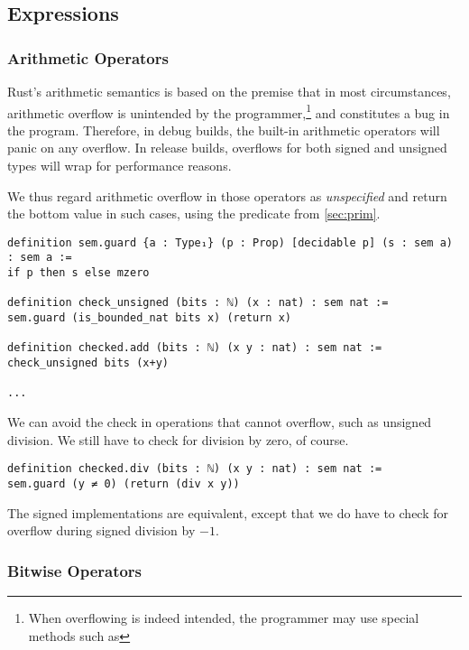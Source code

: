 \subsection{Expressions}

\subsubsection{Arithmetic Operators}
\label{sec:arith}

Rust's arithmetic semantics is based on the premise that in most circumstances,
arithmetic overflow is unintended by the programmer,\footnote{When overflowing
  is indeed intended, the programmer may use special methods such as
  } and constitutes a bug in
the program. Therefore, in debug builds, the built-in arithmetic operators will
panic on any overflow. In release builds, overflows for both signed and unsigned
types will wrap for performance reasons.

We thus regard arithmetic overflow in those operators as \emph{unspecified} and
return the bottom value in such cases, using the predicate
 from \autoref{sec:prim}.

\begin{verbatim}
definition sem.guard {a : Type₁} (p : Prop) [decidable p] (s : sem a) : sem a :=
if p then s else mzero

definition check_unsigned (bits : ℕ) (x : nat) : sem nat :=
sem.guard (is_bounded_nat bits x) (return x)

definition checked.add (bits : ℕ) (x y : nat) : sem nat :=
check_unsigned bits (x+y)

...
\end{verbatim}

We can avoid the check in operations that cannot overflow, such as unsigned
division. We still have to check for division by zero, of course.

\begin{verbatim}
definition checked.div (bits : ℕ) (x y : nat) : sem nat :=
sem.guard (y ≠ 0) (return (div x y))
\end{verbatim}

The signed implementations are equivalent, except that we do have to check for
overflow during signed division by $-1$.

\subsubsection{Bitwise Operators}

